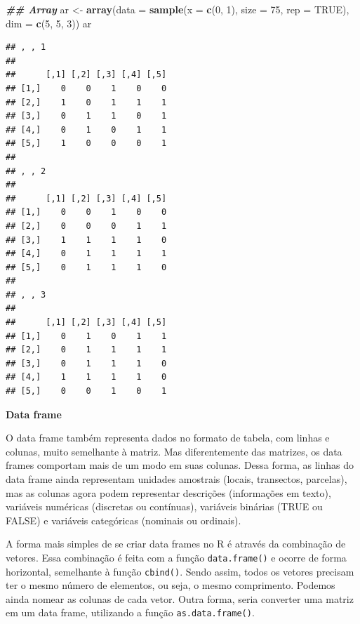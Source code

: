 \documentclass[
]{article}
\newenvironment{Shaded}{\begin{snugshade}}{\end{snugshade}}
\newcommand{\AttributeTok}[1]{\textcolor[rgb]{0.13,0.29,0.53}{#1}}
\newcommand{\ConstantTok}[1]{\textcolor[rgb]{0.56,0.35,0.01}{#1}}
\newcommand{\DecValTok}[1]{\textcolor[rgb]{0.00,0.00,0.81}{#1}}
\newcommand{\DocumentationTok}[1]{\textcolor[rgb]{0.56,0.35,0.01}{\textbf{\textit{#1}}}}
\newcommand{\FunctionTok}[1]{\textcolor[rgb]{0.13,0.29,0.53}{\textbf{#1}}}
\newcommand{\NormalTok}[1]{#1}
\newcommand{\OtherTok}[1]{\textcolor[rgb]{0.56,0.35,0.01}{#1}}
\begin{document}
\begin{Shaded}
\begin{Highlighting}[]
\DocumentationTok{\#\# Array}
\NormalTok{ar }\OtherTok{\textless{}{-}} \FunctionTok{array}\NormalTok{(}\AttributeTok{data =} \FunctionTok{sample}\NormalTok{(}\AttributeTok{x =} \FunctionTok{c}\NormalTok{(}\DecValTok{0}\NormalTok{, }\DecValTok{1}\NormalTok{), }\AttributeTok{size =} \DecValTok{75}\NormalTok{, }\AttributeTok{rep =} \ConstantTok{TRUE}\NormalTok{), }
            \AttributeTok{dim =} \FunctionTok{c}\NormalTok{(}\DecValTok{5}\NormalTok{, }\DecValTok{5}\NormalTok{, }\DecValTok{3}\NormalTok{))}
\NormalTok{ar}
\end{Highlighting}
\end{Shaded}

\begin{verbatim}
## , , 1
## 
##      [,1] [,2] [,3] [,4] [,5]
## [1,]    0    0    1    0    0
## [2,]    1    0    1    1    1
## [3,]    0    1    1    0    1
## [4,]    0    1    0    1    1
## [5,]    1    0    0    0    1
## 
## , , 2
## 
##      [,1] [,2] [,3] [,4] [,5]
## [1,]    0    0    1    0    0
## [2,]    0    0    0    1    1
## [3,]    1    1    1    1    0
## [4,]    0    1    1    1    1
## [5,]    0    1    1    1    0
## 
## , , 3
## 
##      [,1] [,2] [,3] [,4] [,5]
## [1,]    0    1    0    1    1
## [2,]    0    1    1    1    1
## [3,]    0    1    1    1    0
## [4,]    1    1    1    1    0
## [5,]    0    0    1    0    1
\end{verbatim}

\textbf{Data frame}

O data frame também representa dados no formato de tabela, com linhas e colunas, muito semelhante à matriz. Mas diferentemente das matrizes, os data frames comportam mais de um modo em suas colunas. Dessa forma, as linhas do data frame ainda representam unidades amostrais (locais, transectos, parcelas), mas as colunas agora podem representar descrições (informações em texto), variáveis numéricas (discretas ou contínuas), variáveis binárias (TRUE ou FALSE) e variáveis categóricas (nominais ou ordinais).

A forma mais simples de se criar data frames no R é através da combinação de vetores. Essa combinação é feita com a função \texttt{data.frame()} e ocorre de forma horizontal, semelhante à função \texttt{cbind()}. Sendo assim, todos os vetores precisam ter o mesmo número de elementos, ou seja, o mesmo comprimento. Podemos ainda nomear as colunas de cada vetor. Outra forma, seria converter uma matriz em um data frame, utilizando a função \texttt{as.data.frame()}.
\end{document}
